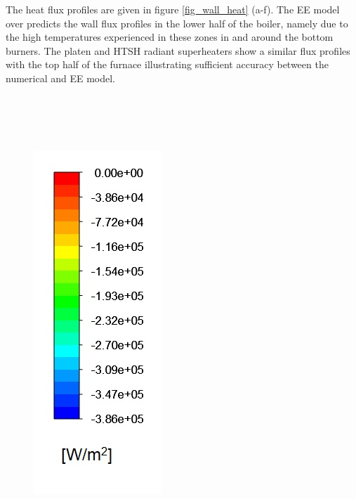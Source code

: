 \documentclass{webofc}
\begin{document}
The heat flux profiles are given in figure \ref{fig_wall_heat} (a-f). The EE model over predicts the wall flux profiles in the lower half of the boiler, namely due to the high temperatures experienced in these zones in and around the bottom burners. The platen and HTSH radiant superheaters show a similar flux profiles with the top half of the furnace illustrating sufficient accuracy between the numerical and EE model.\\
\\
\\
\\
\\
\begin{figure}[h!]
\centering
\includegraphics[scale = 0.4]{wall_heat}

\end{figure}
\end{document}
